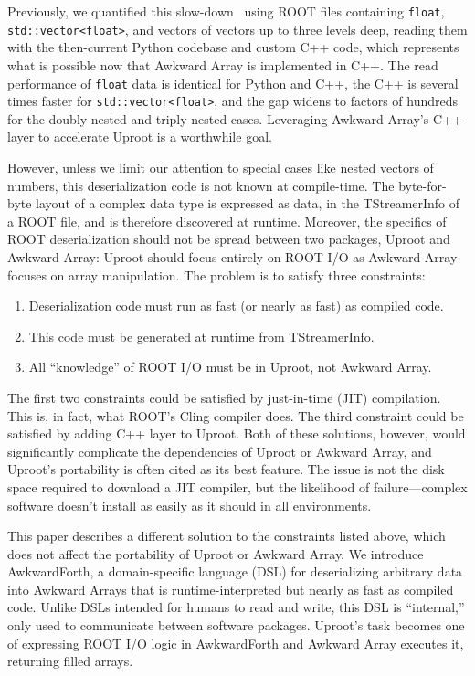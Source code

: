 \documentclass{webofc}
\begin{document}
Previously, we quantified this slow-down~\cite{chep2019} using ROOT files containing \texttt{float}, \texttt{std::vector<float>}, and vectors of vectors up to three levels deep, reading them with the then-current Python codebase and custom C++ code, which represents what is possible now that Awkward Array is implemented in C++. The read performance of \texttt{float} data is identical for Python and C++, the C++ is several times faster for \texttt{std::vector<float>}, and the gap widens to factors of hundreds for the doubly-nested and triply-nested cases. Leveraging Awkward Array's C++ layer to accelerate Uproot is a worthwhile goal.

However, unless we limit our attention to special cases like nested vectors of numbers, this deserialization code is not known at compile-time. The byte-for-byte layout of a complex data type is expressed as data, in the TStreamerInfo of a ROOT file, and is therefore discovered at runtime. Moreover, the specifics of ROOT deserialization should not be spread between two packages, Uproot and Awkward Array: Uproot should focus entirely on ROOT I/O as Awkward Array focuses on array manipulation. The problem is to satisfy three constraints:
\begin{enumerate}
\item Deserialization code must run as fast (or nearly as fast) as compiled code.
\item This code must be generated at runtime from TStreamerInfo.
\item All ``knowledge'' of ROOT I/O must be in Uproot, not Awkward Array.
\end{enumerate}

The first two constraints could be satisfied by just-in-time (JIT) compilation. This is, in fact, what ROOT's Cling compiler does. The third constraint could be satisfied by adding C++ layer to Uproot. Both of these solutions, however, would significantly complicate the dependencies of Uproot or Awkward Array, and Uproot's portability is often cited as its best feature. The issue is not the disk space required to download a JIT compiler, but the likelihood of failure---complex software doesn't install as easily as it should in all environments.

This paper describes a different solution to the constraints listed above, which does not affect the portability of Uproot or Awkward Array. We introduce AwkwardForth, a domain-specific language (DSL) for deserializing arbitrary data into Awkward Arrays that is runtime-interpreted but nearly as fast as compiled code. Unlike DSLs intended for humans to read and write, this DSL is ``internal,'' only used to communicate between software packages. Uproot's task becomes one of expressing ROOT I/O logic in AwkwardForth and Awkward Array executes it, returning filled arrays.
\end{document}
